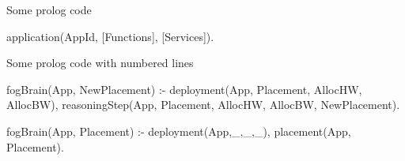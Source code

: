 \documentclass{article}
\author{}
\title{}
\begin{document}
Some prolog code

\begin{code} 
application(AppId, [Functions], [Services]).
\end{code}

Some prolog code with numbered lines

\begin{codeNum}[firstnumber=1]
fogBrain(App, NewPlacement) :-
deployment(App, Placement, AllocHW, AllocBW),
reasoningStep(App, Placement, AllocHW, AllocBW, NewPlacement).

fogBrain(App, Placement) :-
\+deployment(App,_,_,_),
placement(App, Placement).
\end{codeNum}
\end{document}

